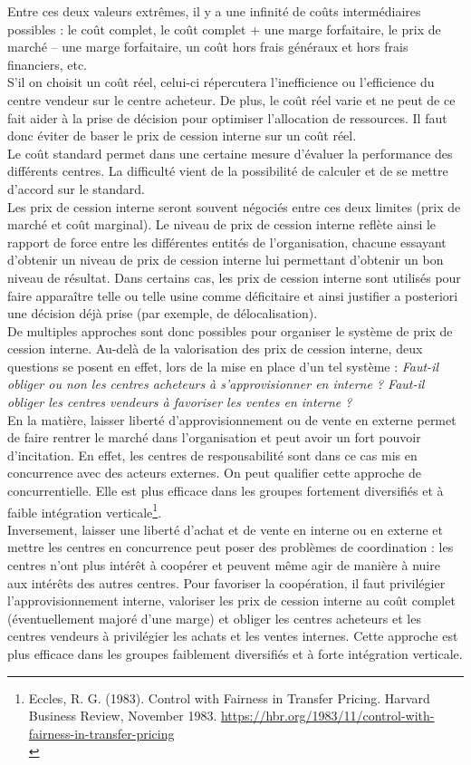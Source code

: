 \documentclass{tufte-handout}
\begin{document}
Entre ces deux valeurs extrêmes, il y a une infinité de coûts intermédiaires possibles : le coût complet, le coût complet + une marge forfaitaire, le prix de marché – une marge forfaitaire, un coût hors frais généraux et hors frais financiers, etc.\\
S’il on choisit un coût réel, celui-ci répercutera l’inefficience ou l’efficience du centre vendeur sur le centre acheteur. De plus, le coût réel varie et ne peut de ce fait aider à la prise de décision pour optimiser l’allocation de ressources. Il faut donc éviter de baser le prix de cession interne sur un coût réel.\\
Le coût standard permet dans une certaine mesure d’évaluer la performance des différents centres. La difficulté vient de la possibilité de calculer et de se mettre d’accord sur le standard.\\
Les prix de cession interne seront souvent négociés entre ces deux limites (prix de marché et coût marginal). Le niveau de prix de cession interne reflète ainsi le rapport de force entre les différentes entités de l’organisation, chacune essayant d’obtenir un niveau de prix de cession interne lui permettant d’obtenir un bon niveau de résultat. Dans certains cas, les prix de cession interne sont utilisés pour faire apparaître telle ou telle usine comme déficitaire et ainsi justifier a posteriori une décision déjà prise (par exemple, de délocalisation).\\

De multiples approches sont donc possibles pour organiser le système de prix de cession interne. Au-delà de la valorisation des prix de cession interne, deux questions se posent en effet, lors de la mise en place d’un tel système : \emph{Faut-il obliger ou non les centres acheteurs à s’approvisionner en interne ? Faut-il obliger les centres vendeurs à favoriser les ventes en interne ?}\\
En la matière, laisser liberté d’approvisionnement ou de vente en externe permet de faire rentrer le marché dans l’organisation et peut avoir un fort pouvoir d’incitation. En effet, les centres de responsabilité sont dans ce cas mis en concurrence avec des acteurs externes. On peut qualifier cette approche de concurrentielle. Elle est plus efficace dans les groupes fortement diversifiés et à faible intégration verticale\footnote{Eccles, R. G. (1983). Control with Fairness in Transfer Pricing. Harvard Business Review, November 1983. \url{https://hbr.org/1983/11/control-with-fairness-in-transfer-pricing}\\}.\\
Inversement, laisser une liberté d’achat et de vente en interne ou en externe et mettre les centres en concurrence peut poser des problèmes de coordination : les centres n’ont plus intérêt à coopérer et peuvent même agir de manière à nuire aux intérêts des autres centres. Pour favoriser la coopération, il faut privilégier l’approvisionnement interne, valoriser les prix de cession interne au coût complet (éventuellement majoré d'une marge) et obliger les centres acheteurs et les centres vendeurs à privilégier les achats et les ventes internes. Cette approche est plus efficace dans les groupes faiblement diversifiés et à forte intégration verticale.\\
\end{document}
